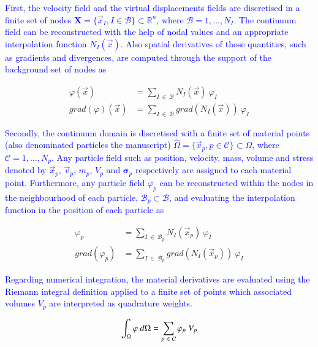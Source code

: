 \documentclass[preprint,12pt,a4paper]{elsarticle}
\newcommand{\tens}[1]{
  \ensuremath{\mathbf{{#1}}}
}
\newcommand\Grad[1]{grad({#1})}
\newcommand{\Integral}[2]{
  \IfStrEqCase{#1}{
    {2}{\ensuremath{\int_{\Gamma_d}{#2}\ d\Gamma}}
    {3}{\ensuremath{\int_{\Omega}{#2}\ d\Omega}}
  }
}
\newcommand{\MODIFIED}[1]{
  \textcolor{blue}{{#1}}
}
\begin{document}
\MODIFIED{First, the velocity field and the virtual displacements fields are discretised in a finite set of nodes $\textbf{X} = \{ \vec{x}_I, I \in \mathcal{B} \} \subset \mathbb{R}^n$, where $\mathcal{B} = 1, \ldots, N_I$. The continuum field can be reconstructed with the help of nodal values and an appropriate interpolation function $N_I(\vec{x})$. Also spatial derivatives of those quantities, such as gradients and divergences, are computed through the support of the background set of nodes as}
\begin{align}
    \label{eq:variable_reconstruction}
    \varphi(\vec{x}) &= \sum_{I\ \in\ \mathcal{B}} N_I(\vec{x})\ \varphi_I \\
    \label{eq:grad_variable_reconstruction}
    \Grad{\varphi}(\vec{x}) &= \sum_{I\ \in\ \mathcal{B}} \Grad{N_I(\vec{x})}\ \varphi_I
\end{align}
\MODIFIED{Secondly, the continuum \gls{domain} is discretised with a finite set of material points (also denominated particles the manuscript) $\hat{\Omega} = \{ \vec{x}_p, p \in \mathcal{C} \} \subset \Omega$, where $\mathcal{C} = 1, \ldots, N_p$. Any particle field such as position, velocity, mass, volume and stress denoted by $\vec{x}_p$, $\vec{v}_p$, $m_p$, $V_p$ and $\tens{\sigma}_p$ respectively are assigned to each material point. Furthermore, any particle field $\varphi_p$ can be reconstructed within the nodes in the neighbourhood of each particle, $\mathcal{B}_p \subset \mathcal{B}$, and evaluating the interpolation function in the position of each particle as}
\begin{align}
    \label{eq:particle_variable_reconstruction}
\varphi_p &= \sum_{I\ \in\ \mathcal{B}_p} N_I(\vec{x}_p)\ \varphi_I \\
\Grad{\varphi_p} &= \sum_{I\ \in\ \mathcal{B}_p} \Grad{N_I(\vec{x}_p)}\ \varphi_I
\end{align}
\MODIFIED{Regarding numerical integration, the material derivatives are evaluated using the Riemann integral definition \cite{Riemann_1854} applied to a finite set of points which associated volumes $V_p$ are interpreted as quadrature weights.}
\begin{equation}
    \label{eq:particle_riemann_integral}
\Integral{3}{\varphi} = \sum_{p\ \in\ \mathcal{C}} \varphi_p\ V_p 
\end{equation}
\end{document}
